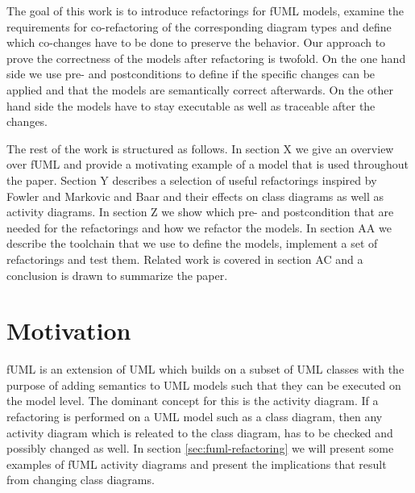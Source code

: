 \documentclass{llncs}
\begin{document}

The goal of this work is to introduce refactorings for fUML models, examine the requirements for co-refactoring of the
corresponding diagram types and define which co-changes have to be done to preserve the behavior. Our approach to prove
the correctness of the models after refactoring is twofold. On the one hand side we use pre- and postconditions
\cite{rob99} to define if the specific changes can be applied and that the models are semantically correct afterwards.
On the other hand side the models have to stay executable as well as traceable after the changes.



The rest of the work is structured as follows. In section X we give an overview over fUML and provide a motivating
example of a model that is used throughout the paper. Section Y describes a selection of useful refactorings inspired by
Fowler \cite{fow99} and Markovic and Baar \cite{DBLP:journals/sosym/MarkovicB08} and their effects on class diagrams as
well as activity diagrams. In section Z we show which pre- and postcondition that are needed for the refactorings and
how we refactor the models. In section AA we describe the toolchain that we use to define the models, implement a set of
refactorings and test them. Related work is covered in section AC and a conclusion is drawn to summarize the paper.



\section{Motivation}
fUML is an extension of UML which builds on a subset of UML classes with the purpose of adding semantics to UML models such that they can
be executed on the model level. The dominant concept for this is the activity diagram. If a refactoring is performed on a UML model such
as a class diagram, then any activity diagram which is releated to the class diagram, has to be checked and possibly changed as well. In
section \ref{sec:fuml-refactoring} we will present some examples of fUML activity diagrams and present the implications that result from
changing class diagrams.
\end{document}
